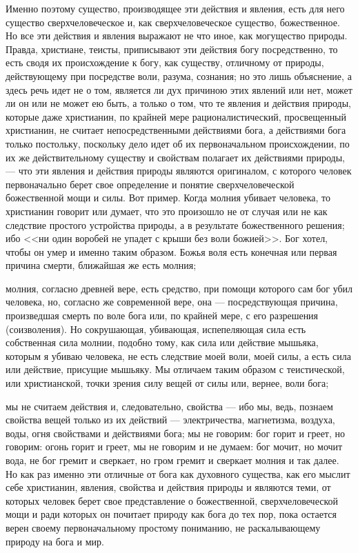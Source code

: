 \documentclass[12pt]{article}
\begin{document}
Именно поэтому существо, производящее эти действия и явления, есть для него существо сверхчеловеческое и, как сверхчеловеческое существо, божественное. Но все эти действия и явления выражают не что иное, как могущество природы. Правда, христиане, теисты, приписывают эти действия богу посредственно, то есть сводя их происхождение к богу, как существу, отличному от природы, действующему при посредстве воли, разума, сознания; но это лишь объяснение, а здесь речь идет не о том, является ли дух причиною этих явлений или нет, может ли он или не может ею быть, а только о том, что те явления и действия природы, которые даже христианин, по крайней мере рационалистический, просвещенный христианин, не считает непосредственными действиями бога, а действиями бога только постольку, поскольку дело идет об их первоначальном происхождении, по их же действительному существу и свойствам полагает их действиями природы, --- что эти явления и действия природы являются оригиналом, с которого человек первоначально берет свое определение и понятие сверхчеловеческой божественной мощи и силы. Вот пример. Когда молния убивает человека, то христианин говорит или думает, что это произошло не от случая или не как следствие простого устройства природы, а в результате божественного решения; ибо <<ни один воробей не упадет с крыши без воли божией>>. Бог хотел, чтобы он умер и именно таким образом. Божья воля есть конечная или первая причина смерти, ближайшая же есть молния; 

молния, согласно древней вере, есть средство, при помощи которого сам бог убил человека, но, согласно же современной вере, она --- посредствующая причина, произведшая смерть по воле бога или, по крайней мере, с его разрешения (соизволения). Но сокрушающая, убивающая, испепеляющая сила есть собственная сила молнии, подобно тому, как сила или действие мышьяка, которым я убиваю человека, не есть следствие моей воли, моей силы, а есть сила или действие, присущие мышьяку. Мы отличаем таким образом с теистической, или христианской, точки зрения силу вещей от силы или, вернее, воли бога; 

мы не считаем действия и, следовательно, свойства --- ибо мы, ведь, познаем свойства вещей только из их действий --- электричества, магнетизма, воздуха, воды, огня свойствами и действиями бога; мы не говорим: бог горит и греет, но говорим: огонь горит и греет, мы не говорим и не думаем: бог мочит, но мочит вода, не бог гремит и сверкает, но гром гремит и сверкает молния и так далее. Но как раз именно эти отличные от бога как духовного существа, как его мыслит себе христианин, явления, свойства и действия природы и являются теми, от которых человек берет свое представление о божественной, сверхчеловеческой мощи и ради которых он почитает природу как бога до тех пор, пока остается верен своему первоначальному простому пониманию, не раскалывающему природу на бога и мир. 
\end{document}
